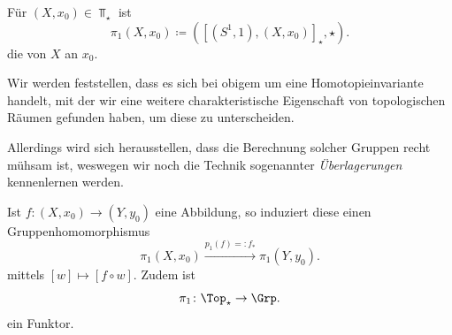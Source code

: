 \begin{definition}[Fundamentalgruppe]\label{def:fundamentalgruppe}
    Für $(X,x_0) \in \Top_{\star}$ ist 
    \[
        \pi_1(X,x_0) \coloneqq  ([(S^1,1),(X,x_0)]_{\star},\star)
    .\] 
    die  von $X$ an  $x_0$. 
\end{definition}

\begin{oral}
    Wir werden feststellen, dass es sich bei obigem um eine Homotopieinvariante handelt, mit der wir eine weitere charakteristische Eigenschaft von topologischen Räumen gefunden haben, um diese zu unterscheiden. 

    Allerdings wird sich herausstellen, dass die Berechnung solcher Gruppen recht mühsam ist, weswegen wir noch die Technik sogenannter \textit{Überlagerungen} kennenlernen werden.
\end{oral}

\begin{theorem}
    Ist $f\colon  (X,x_0) \to  (Y,y_0)$ eine Abbildung, so induziert diese einen Gruppenhomomorphismus
    \[
        \pi_1 (X,x_0) \stackrel{p_1(f) =: f_*}{\longrightarrow}   \pi_1(Y,y_0)
    .\] 
    mittels $[w] \mapsto [f \circ  w]$. Zudem ist
    \[
    \pi_1\colon  \Top_{\star} \to  \Grp
    .\] 
    ein Funktor.
\end{theorem}

